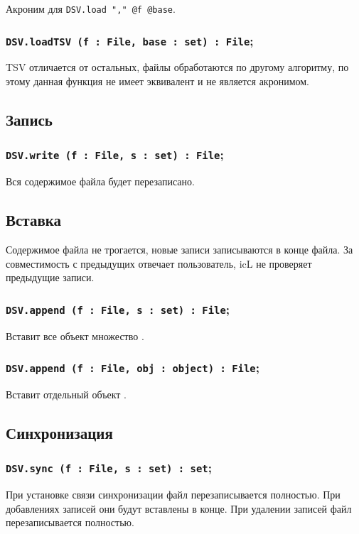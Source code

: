 Акроним для \lstinline|DSV.load "," @f @base|.

\subsubsection{\lstinline|DSV.loadTSV (f : File, base : set) : File|;}

TSV отличается от остальных, файлы обработаются по другому алгоритму, по этому данная функция не имеет эквивалент и не является акронимом.

\subsection{Запись}

\subsubsection{\lstinline|DSV.write (f : File, s : set) : File|;}

Вся содержимое файла будет перезаписано.

\subsection{Вставка}

Содержимое файла не трогается, новые записи записываются в конце файла. За совместимость с предыдущих отвечает пользователь, icL не проверяет предыдущие записи.

\subsubsection{\lstinline|DSV.append (f : File, s : set) : File|;}

Вставит все объект множество .

\subsubsection{\lstinline|DSV.append (f : File, obj : object) : File|;}

Вставит отдельный объект .

\subsection{Синхронизация}

\subsubsection{\lstinline|DSV.sync (f : File, s : set) : set|;}

При установке связи синхронизации файл перезаписывается полностью. При добавлениях записей они будут вставлены в конце. При удалении записей файл перезаписывается полностью.

